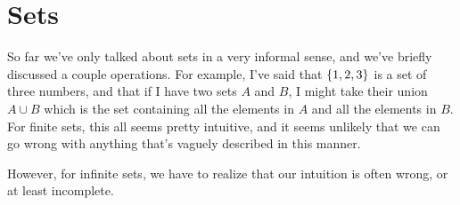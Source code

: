 \section{Sets}

So far we've only talked about sets in a very informal sense, and we've briefly discussed a couple operations.
For example, I've said that ${\left\{ {1,2,3} \right\}}$ is a set of three numbers, and that if I have two sets $A$ and $B$, I might take their union $A \cup B$ which is the set containing all the elements in $A$ and all the elements in $B$.
For finite sets, this all seems pretty intuitive, and it seems unlikely that we can go wrong with anything that's vaguely described in this manner.

However, for infinite sets, we have to realize that our intuition is often wrong, or at least incomplete.

